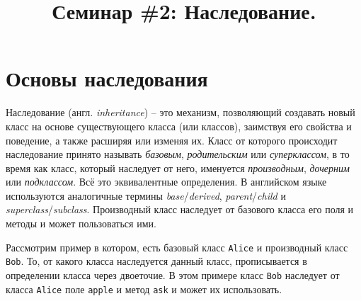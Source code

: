 \documentclass{article}
\begin{document}
\title{Семинар \#2: Наследование. \vspace{-5ex}}\date{}\maketitle
\section{Основы наследования}
Наследование (англ. \textit{inheritance}) -- это механизм, позволяющий создавать новый класс на основе существующего класса (или классов), заимствуя его свойства и поведение, а также расширяя или изменяя их. 
Класс от которого происходит наследование принято называть \textit{базовым}, \textit{родительским} или \textit{суперклассом}, в то время как класс, который наследует от него, именуется \textit{производным}, \textit{дочерним} или \textit{подклассом}. Всё это эквивалентные определения. В английском языке используются аналогичные термины \textit{base}/\textit{derived}, \textit{parent}/\textit{child} и \textit{superclass}/\textit{subclass}. Производный класс наследует от базового класса его поля и методы и может пользоваться ими.

Рассмотрим пример в котором, есть базовый класс \texttt{Alice} и производный класс \texttt{Bob}. То, от какого класса наследуется данный класс, прописывается в определении класса через двоеточие. В этом примере класс \texttt{Bob} наследует от класса \texttt{Alice} поле \texttt{apple} и метод \texttt{ask} и может их использовать.
\end{document}
